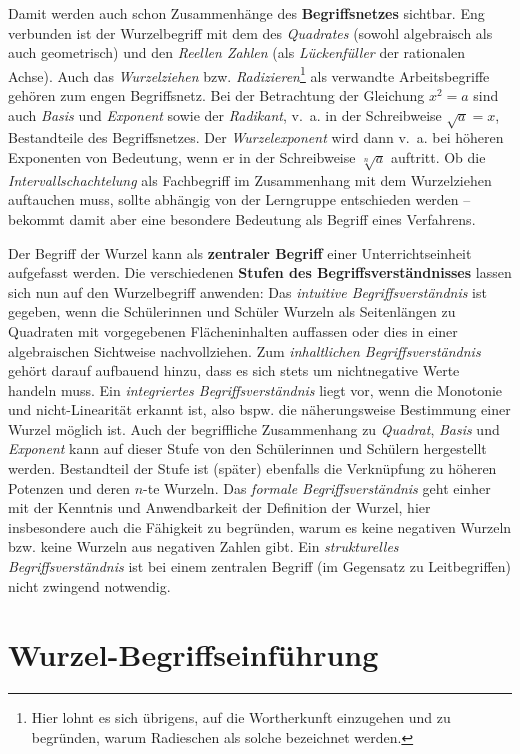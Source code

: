 \documentclass[
  ngerman,
]{scrbook}
\theoremstyle{definition}
\theoremstyle{definition}
\theoremstyle{definition}
\theoremstyle{definition}
\theoremstyle{remark}
\begin{document}
Damit werden auch schon Zusammenhänge des \textbf{Begriffsnetzes} sichtbar. Eng verbunden ist der Wurzelbegriff mit dem des \emph{Quadrates} (sowohl algebraisch als auch geometrisch) und den \emph{Reellen Zahlen} (als \emph{Lückenfüller} der rationalen Achse). Auch das \emph{Wurzelziehen} bzw. \emph{Radizieren}\footnote{Hier lohnt es sich übrigens, auf die Wortherkunft einzugehen und zu begründen, warum Radieschen als solche bezeichnet werden.} als verwandte Arbeitsbegriffe gehören zum engen Begriffsnetz. Bei der Betrachtung der Gleichung \(x^2 = a\) sind auch \emph{Basis} und \emph{Exponent} sowie der \emph{Radikant}, v.~a. in der Schreibweise \(\sqrt{a} = x\), Bestandteile des Begriffsnetzes. Der \emph{Wurzelexponent} wird dann v.~a. bei höheren Exponenten von Bedeutung, wenn er in der Schreibweise \(\sqrt[n]{a}\) auftritt. Ob die \emph{Intervallschachtelung} als Fachbegriff im Zusammenhang mit dem Wurzelziehen auftauchen muss, sollte abhängig von der Lerngruppe entschieden werden -- bekommt damit aber eine besondere Bedeutung als Begriff eines Verfahrens.

Der Begriff der Wurzel kann als \textbf{zentraler Begriff} einer Unterrichtseinheit aufgefasst werden. Die verschiedenen \textbf{Stufen des Begriffsverständnisses} lassen sich nun auf den Wurzelbegriff anwenden: Das \emph{intuitive Begriffsverständnis} ist gegeben, wenn die Schülerinnen und Schüler Wurzeln als Seitenlängen zu Quadraten mit vorgegebenen Flächeninhalten auffassen oder dies in einer algebraischen Sichtweise nachvollziehen. Zum \emph{inhaltlichen Begriffsverständnis} gehört darauf aufbauend hinzu, dass es sich stets um nichtnegative Werte handeln muss. Ein \emph{integriertes Begriffsverständnis} liegt vor, wenn die Monotonie und nicht-Linearität erkannt ist, also bspw. die näherungsweise Bestimmung einer Wurzel möglich ist. Auch der begriffliche Zusammenhang zu \emph{Quadrat}, \emph{Basis} und \emph{Exponent} kann auf dieser Stufe von den Schülerinnen und Schülern hergestellt werden. Bestandteil der Stufe ist (später) ebenfalls die Verknüpfung zu höheren Potenzen und deren \(n\)-te Wurzeln. Das \emph{formale Begriffsverständnis} geht einher mit der Kenntnis und Anwendbarkeit der Definition der Wurzel, hier insbesondere auch die Fähigkeit zu begründen, warum es keine negativen Wurzeln bzw. keine Wurzeln aus negativen Zahlen gibt. Ein \emph{strukturelles Begriffsverständnis} ist bei einem zentralen Begriff (im Gegensatz zu Leitbegriffen) nicht zwingend notwendig.

\hypertarget{wurzel-begriffseinfuxfchrung}{%
\section{Wurzel-Begriffseinführung}\label{wurzel-begriffseinfuxfchrung}}
\end{document}
